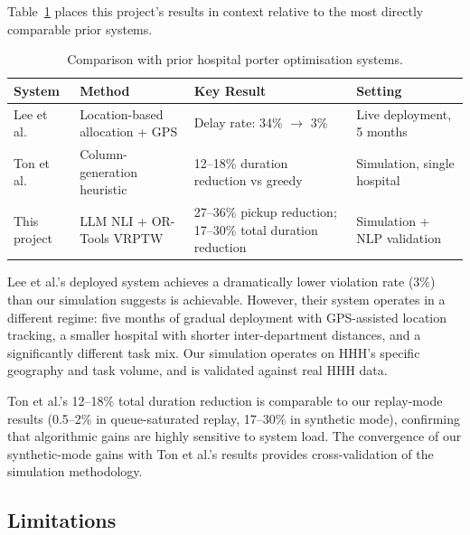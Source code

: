 \documentclass[12pt,a4paper]{article}
\begin{document}
Table~\ref{tab:comparison} places this project's results in context relative to the most directly comparable prior systems.

\begin{table}[H]
\centering
\caption{Comparison with prior hospital porter optimisation systems.}
\label{tab:comparison}
\begin{tabular}{p{3cm}p{3.5cm}p{3.5cm}p{2.5cm}}
\toprule
\textbf{System} & \textbf{Method} & \textbf{Key Result} & \textbf{Setting} \\
\midrule
Lee et al.\ \cite{lee2023} & Location-based allocation + GPS & Delay rate: 34\% $\to$ 3\% & Live deployment, 5 months \\
Ton et al.\ \cite{ton2024} & Column-generation heuristic & 12--18\% duration reduction vs greedy & Simulation, single hospital \\
This project & LLM NLI + OR-Tools VRPTW & 27--36\% pickup reduction; 17--30\% total duration reduction & Simulation + NLP validation \\
\bottomrule
\end{tabular}
\end{table}

Lee et al.'s deployed system achieves a dramatically lower violation rate (3\%) than our simulation suggests is achievable. However, their system operates in a different regime: five months of gradual deployment with GPS-assisted location tracking, a smaller hospital with shorter inter-department distances, and a significantly different task mix. Our simulation operates on HHH's specific geography and task volume, and is validated against real HHH data.

Ton et al.'s 12--18\% total duration reduction is comparable to our replay-mode results (0.5--2\% in queue-saturated replay, 17--30\% in synthetic mode), confirming that algorithmic gains are highly sensitive to system load. The convergence of our synthetic-mode gains with Ton et al.'s results provides cross-validation of the simulation methodology.

\subsection{Limitations}
\end{document}

